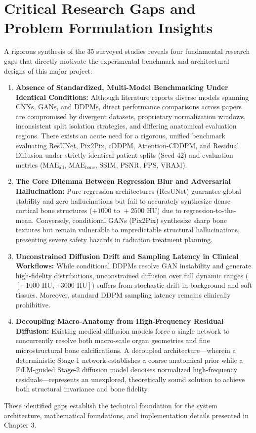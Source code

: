 \section{Critical Research Gaps and Problem Formulation Insights}
A rigorous synthesis of the 35 surveyed studies reveals four fundamental research gaps that directly motivate the experimental benchmark and architectural designs of this major project:
\begin{enumerate}[label=\textbf{Gap \arabic*:}]
    \item \textbf{Absence of Standardized, Multi-Model Benchmarking Under Identical Conditions:} Although literature reports diverse models spanning CNNs, GANs, and DDPMs, direct performance comparisons across papers are compromised by divergent datasets, proprietary normalization windows, inconsistent split isolation strategies, and differing anatomical evaluation regions. There exists an acute need for a rigorous, unified benchmark evaluating ResUNet, Pix2Pix, cDDPM, Attention-CDDPM, and Residual Diffusion under strictly identical patient splits (Seed 42) and evaluation metrics ($\text{MAE}_{\text{all}}$, $\text{MAE}_{\text{bone}}$, SSIM, PSNR, FPS, VRAM).
    \item \textbf{The Core Dilemma Between Regression Blur and Adversarial Hallucination:} Pure regression architectures (ResUNet) guarantee global stability and zero hallucinations but fail to accurately synthesize dense cortical bone structures ($+1000\text{ to }+2500\text{ HU}$) due to regression-to-the-mean. Conversely, conditional GANs (Pix2Pix) synthesize sharp bone textures but remain vulnerable to unpredictable structural hallucinations, presenting severe safety hazards in radiation treatment planning.
    \item \textbf{Unconstrained Diffusion Drift and Sampling Latency in Clinical Workflows:} While conditional DDPMs resolve GAN instability and generate high-fidelity distributions, unconstrained diffusion over full dynamic ranges ($[-1000\text{ HU}, +3000\text{ HU}]$) suffers from stochastic drift in background and soft tissues. Moreover, standard DDPM sampling latency remains clinically prohibitive.
    \item \textbf{Decoupling Macro-Anatomy from High-Frequency Residual Diffusion:} Existing medical diffusion models force a single network to concurrently resolve both macro-scale organ geometries and fine microstructural bone calcifications. A decoupled architecture—wherein a deterministic Stage-1 network establishes a coarse anatomical prior while a FiLM-guided Stage-2 diffusion model denoises normalized high-frequency residuals—represents an unexplored, theoretically sound solution to achieve both structural invariance and bone fidelity.
\end{enumerate}

These identified gaps establish the technical foundation for the system architecture, mathematical foundations, and implementation details presented in Chapter 3.
